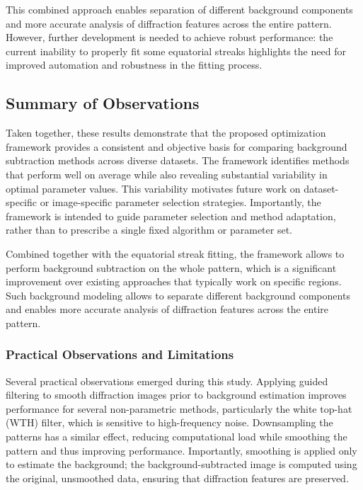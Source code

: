 \documentclass[iucr]{iucrjournals}
\begin{document}
This combined approach enables separation of different background components and more accurate analysis of diffraction features across the entire pattern. However, further development is needed to achieve robust performance: the current inability to properly fit some equatorial streaks highlights the need for improved automation and robustness in the fitting process.

\subsection{Summary of Observations}

Taken together, these results demonstrate that the proposed optimization framework provides a consistent and objective basis for comparing background subtraction methods across diverse datasets. The framework identifies methods that perform well on average while also revealing substantial variability in optimal parameter values. This variability motivates future work on dataset-specific or image-specific parameter selection strategies. Importantly, the framework is intended to guide parameter selection and method adaptation, rather than to prescribe a single fixed algorithm or parameter set.

Combined together with the equatorial streak fitting, the framework allows to perform background subtraction on the whole pattern, which is a significant improvement over existing approaches that typically work on specific regions. Such background modeling allows to separate different background components and enables more accurate analysis of diffraction features across the entire pattern.

\subsubsection{Practical Observations and Limitations}

Several practical observations emerged during this study. Applying guided filtering to smooth diffraction images prior to background estimation improves performance for several non-parametric methods, particularly the white top-hat (WTH) filter, which is sensitive to high-frequency noise. Downsampling the patterns has a similar effect, reducing computational load while smoothing the pattern and thus improving performance. Importantly, smoothing is applied only to estimate the background; the background-subtracted image is computed using the original, unsmoothed data, ensuring that diffraction features are preserved. 
\end{document}
